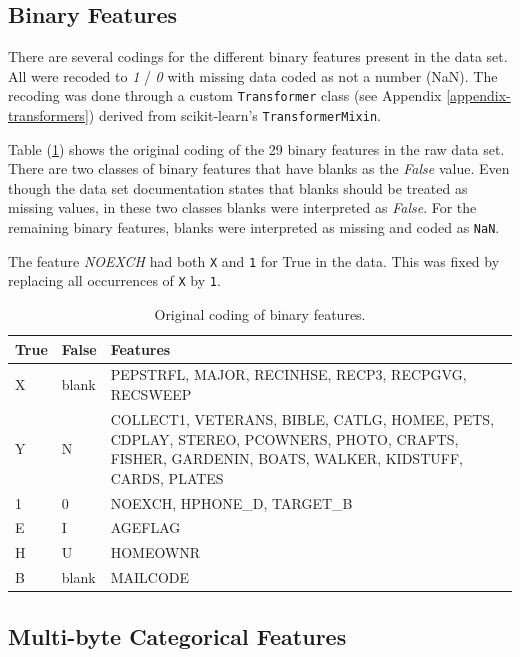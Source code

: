 \documentclass[
  11pt,
  a4paper,
  DIV=12,captions=tableheading,oneside]{scrbook}
\begin{document}
\hypertarget{binary-features}{%
\subsection{Binary Features}\label{binary-features}}

There are several codings for the different binary features present in the data set. All were recoded to \emph{1} / \emph{0} with missing data coded as not a number (NaN). The recoding was done through a custom \texttt{Transformer} class (see Appendix \ref{appendix-transformers}) derived from scikit-learn's \texttt{TransformerMixin}.

Table (\ref{tab:binary-recode}) shows the original coding of the 29 binary features in the raw data set. There are two classes of binary features that have blanks as the \emph{False} value. Even though the data set documentation states that blanks should be treated as missing values, in these two classes blanks were interpreted as \emph{False}. For the remaining binary features, blanks were interpreted as missing and coded as \texttt{NaN}.

The feature \emph{NOEXCH} had both \texttt{X} and \texttt{1} for True in the data. This was fixed by replacing all occurrences of \texttt{X} by \texttt{1}.

\begin{table}[!h]

\caption{\label{tab:binary-recode}Original coding of binary features.}
\centering
\begin{tabular}{ll>{\raggedright\arraybackslash}p{10cm}}
\toprule
True & False & Features\\
\midrule
X & blank & PEPSTRFL, MAJOR, RECINHSE, RECP3, RECPGVG, RECSWEEP\\
Y & N & COLLECT1, VETERANS, BIBLE, CATLG, HOMEE, PETS, CDPLAY, STEREO,
      PCOWNERS, PHOTO, CRAFTS, FISHER, GARDENIN,  BOATS, WALKER, KIDSTUFF,
      CARDS, PLATES\\
1 & 0 & NOEXCH, HPHONE\_D, TARGET\_B\\
E & I & AGEFLAG\\
H & U & HOMEOWNR\\
\addlinespace
B & blank & MAILCODE\\
\bottomrule
\end{tabular}
\end{table}

\hypertarget{multi-byte-categorical-features}{%
\subsection{Multi-byte Categorical Features}\label{multi-byte-categorical-features}}
\end{document}
